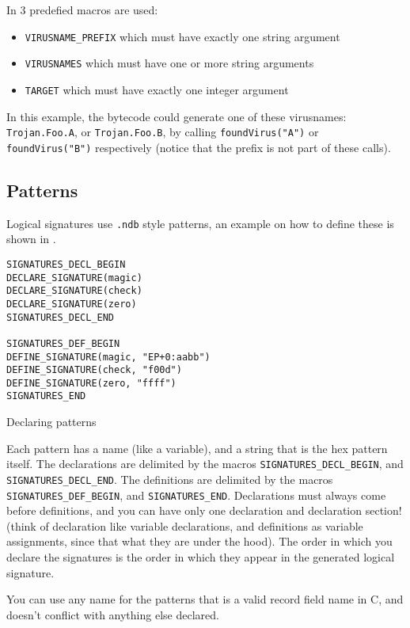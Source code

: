 In  3 predefied macros are used:
\begin{itemize}
 \item \verb+VIRUSNAME_PREFIX+ which must have exactly one string argument
 \item \verb+VIRUSNAMES+ which must have one or more string arguments
 \item \verb+TARGET+ which must have exactly one integer argument
\end{itemize}

In this example, the bytecode could generate one of these virusnames:
\verb+Trojan.Foo.A+, or \verb+Trojan.Foo.B+, by calling
\verb+foundVirus("A")+ or \verb+foundVirus("B")+ respectively (notice that the prefix is not part of these calls).

\subsection{Patterns}
Logical signatures use \verb+.ndb+ style patterns, an example on how to define these
is shown in .
\begin{program}
\begin{lstlisting}
SIGNATURES_DECL_BEGIN
DECLARE_SIGNATURE(magic)
DECLARE_SIGNATURE(check)
DECLARE_SIGNATURE(zero)
SIGNATURES_DECL_END

SIGNATURES_DEF_BEGIN
DEFINE_SIGNATURE(magic, "EP+0:aabb")
DEFINE_SIGNATURE(check, "f00d")
DEFINE_SIGNATURE(zero, "ffff")
SIGNATURES_END
\end{lstlisting}
\caption{Declaring patterns}
\label{prg:patterns}
\end{program}

Each pattern has a name (like a variable), and a string that is the hex pattern itself.
The declarations are delimited by the macros \verb+SIGNATURES_DECL_BEGIN+, and \verb+SIGNATURES_DECL_END+.
The definitions are delimited by the macros \verb+SIGNATURES_DEF_BEGIN+, and \verb+SIGNATURES_END+.
Declarations must always come before definitions, and you can have only one
declaration and declaration section!
(think of declaration like variable
declarations, and definitions as variable assignments, since that what they are under the hood).
The order in which you declare the signatures is the order in which they appear in the generated
logical signature.

You can use any name for the patterns that is a valid record field name in C,
and doesn't conflict with anything else declared.


